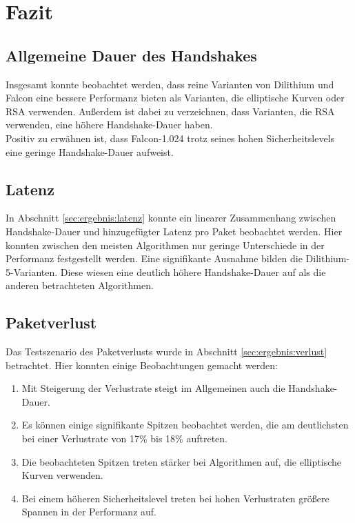 \chapter{Fazit}
\label{ch:fazit}

	\section{Allgemeine Dauer des Handshakes}
	\label{sec:fazit:allgemein}
	
	Insgesamt konnte beobachtet werden, dass reine Varianten von Dilithium und Falcon eine bessere Performanz bieten als Varianten, die elliptische Kurven oder RSA verwenden. Außerdem ist dabei zu verzeichnen, dass Varianten, die RSA verwenden, eine höhere Handshake-Dauer haben.\\
	
	Positiv zu erwähnen ist, dass Falcon-1.024 trotz seines hohen Sicherheitslevels eine geringe Handshake-Dauer aufweist.

	\section{Latenz}
	\label{sec:fazit:latenz}
	
	In Abschnitt \ref{sec:ergebnis:latenz} konnte ein linearer Zusammenhang zwischen Handshake-Dauer und hinzugefügter Latenz pro Paket beobachtet werden. Hier konnten zwischen den meisten Algorithmen nur geringe Unterschiede in der Performanz festgestellt werden. Eine signifikante Ausnahme bilden die Dilithium-5-Varianten. Diese wiesen eine deutlich höhere Handshake-Dauer auf als die anderen betrachteten Algorithmen.
	
	\section{Paketverlust}
	\label{sec:fazit:verlust}
	
	Das Testszenario des Paketverlusts wurde in Abschnitt \ref{sec:ergebnis:verlust} betrachtet. Hier konnten einige Beobachtungen gemacht werden:
	
	\begin{enumerate}
		\item Mit Steigerung der Verlustrate steigt im Allgemeinen auch die Handshake-Dauer.
		\item Es können einige signifikante Spitzen beobachtet werden, die am deutlichsten bei einer Verlustrate von 17\% bis 18\% auftreten.
		\item Die beobachteten Spitzen treten stärker bei Algorithmen auf, die elliptische Kurven verwenden.
		\item Bei einem höheren Sicherheitslevel treten bei hohen Verlustraten größere Spannen in der Performanz auf.
	\end{enumerate}
	
